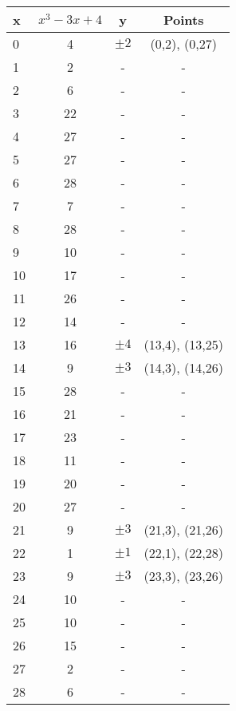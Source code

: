 \documentclass[11pt, pdftex]{article}
\begin{document}
\begin{center}
\begin{tabular}{|l|c|c|c|}
 \hline
x & $x^{3} - 3x + 4$ & y & Points \\
\hline
0 & 4 & $\pm2$ & (0,2), (0,27) \\
\hline
1 & 2 & - &  - \\
\hline
2 & 6 & - &  - \\
\hline
3 & 22 & - &  - \\
\hline
4 & 27 & - &  - \\
\hline
5 & 27 & - &  - \\
\hline
6 & 28 & - &  - \\
\hline
7 & 7 & - &  - \\
\hline
8 & 28 & - &  - \\
\hline
9 & 10 & - &  - \\
\hline
10 & 17 & - &  - \\
\hline
11 & 26 & - &  - \\
\hline
12 & 14 & - &  - \\
\hline
13 & 16 & $\pm4$ & (13,4), (13,25) \\
\hline
14 & 9 & $\pm3$ & (14,3), (14,26) \\
\hline
15 & 28 & - &  - \\
\hline
16 & 21 & - &  - \\
\hline
17 & 23 & - &  - \\
\hline
18 & 11 & - &  - \\
\hline
19 & 20 & - &  - \\
\hline
20 & 27 & - &  - \\
\hline
21 & 9 & $\pm3$ & (21,3), (21,26) \\
\hline
22 & 1 & $\pm1$ & (22,1), (22,28) \\
\hline
23 & 9 & $\pm3$ & (23,3), (23,26) \\
\hline
24 & 10 & - &  - \\
\hline
25 & 10 & - &  - \\
\hline
26 & 15 & - &  - \\
\hline
27 & 2 & - &  - \\
\hline
28 & 6 & - &  - \\
\hline
\end{tabular}
\end{center}
\end{document}
